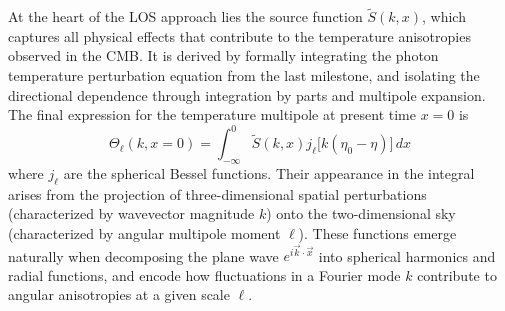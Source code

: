 \documentclass{aa}
\numberwithin{equation}{section}
\numberwithin{table}{section}
\numberwithin{figure}{section}
\begin{document}
At the heart of the LOS approach lies the source function $\tilde{S}(k, x)$, which captures all physical effects that contribute to the temperature anisotropies observed in the CMB. It is derived by formally integrating the photon temperature perturbation equation from the last milestone, and isolating the directional dependence through integration by parts and multipole expansion. The final expression for the temperature multipole at present time $x = 0$ is
\begin{equation}
\Theta_\ell(k, x=0) = \int_{-\infty}^{0} \tilde{S}(k, x) j_\ell\big[k(\eta_0 - \eta)\big]\, dx \label{eq: multipoles LOS}
\end{equation}
where $j_\ell$ are the spherical Bessel functions. Their appearance in the integral arises from the projection of three-dimensional spatial perturbations (characterized by wavevector magnitude $k$) onto the two-dimensional sky (characterized by angular multipole moment $\ell$). These functions emerge naturally when decomposing the plane wave $e^{i \vec{k} \cdot \vec{x}}$ into spherical harmonics and radial functions, and encode how fluctuations in a Fourier mode $k$ contribute to angular anisotropies at a given scale $\ell$. 
\end{document}
